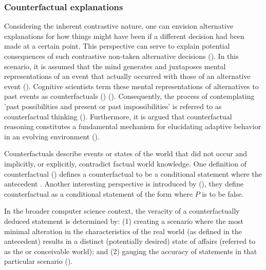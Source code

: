 \documentclass[binding=0.6cm]{sapthesis}
\newcommand{\mycite}[1]{(\cite{#1})}
\begin{document}
\subsubsection{Counterfactual explanations}
\label{sec:bg.xai.counterfactual}
Considering the inherent contrastive nature, one can envision alternative explanations for how things might have been if a different decision had been made at a certain point. This perspective can serve to explain potential consequences of such contrastive non-taken alternative decisions \mycite{stepin2021-xai-cf-contrative-survey}. In this scenario, it is assumed that the mind generates and juxtaposes mental representations of an event that actually occurred with those of an alternative event \mycite{byrne2015-cf-thought}. Cognitive scientists term these mental representations of alternatives to past events as counterfactuals () \mycite{roese1997-cf-thinking}. Consequently, the process of contemplating 'past possibilities and present or past impossibilities' is referred to as counterfactual thinking \mycite{byrne1997-cognitivePI}. Furthermore, it is argued that counterfactual reasoning constitutes a fundamental mechanism for elucidating adaptive behavior in an evolving environment \mycite{paik2014-cf-reason-key,zhou2015-learning,zhang2015-reinforcement}.

Counterfactuals describe events or states of the world that did not occur and implicitly, or explicitly, contradict factual world knowledge. One definition of counterfactual \mycite{grahne1991-updates-and-cf} defines a counterfactual to be a conditional statement where the antecedent . Another interesting perspective is introduced by \mycite{ginsberg1986-counterfactuals}, they define counterfactual as a conditional statement of the form  where $P$ is  to be false.

In the broader computer science context, the veracity of a counterfactually deduced statement is determined by: (1) creating a scenario where the most minimal alteration in the characteristics of the real world (as defined in the antecedent) results in a distinct (potentially desired) state of affairs (referred to as the  or  conceivable world); and (2) gauging the accuracy of statements in that particular scenario \mycite{lewis1989-plurality-worlds}.




\end{document}
